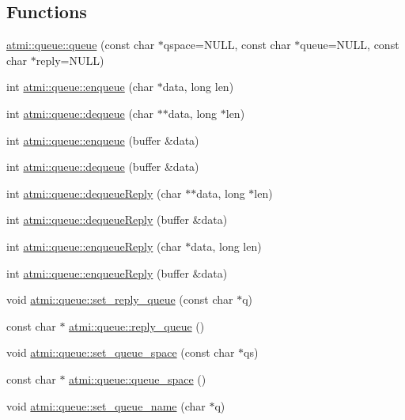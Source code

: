 \subsection*{Functions}
\begin{DoxyCompactItemize}
\item 
\hyperlink{group__atmi_gaf8c86b01e410fe6499a7f53cdf70eb35}{atmi\+::queue\+::queue} (const char $\ast$qspace=N\+U\+L\+L, const char $\ast$queue=N\+U\+L\+L, const char $\ast$reply=N\+U\+L\+L)
\item 
int \hyperlink{group__atmi_ga6b27337fd68ca97236e4905d09b7eb15}{atmi\+::queue\+::enqueue} (char $\ast$data, long len)
\item 
int \hyperlink{group__atmi_ga140e0faa2ab1265d3258ebc5f2049c41}{atmi\+::queue\+::dequeue} (char $\ast$$\ast$data, long $\ast$len)
\item 
int \hyperlink{group__atmi_ga76cf5d92f7d727b0af48698cca6225c5}{atmi\+::queue\+::enqueue} (buffer \&data)
\item 
int \hyperlink{group__atmi_ga656e7c4acd4bfefdbecf098907020fad}{atmi\+::queue\+::dequeue} (buffer \&data)
\item 
int \hyperlink{group__atmi_gaa8a60e7609a1c28ec346a898a80f8ea6}{atmi\+::queue\+::dequeue\+Reply} (char $\ast$$\ast$data, long $\ast$len)
\item 
int \hyperlink{group__atmi_ga1d0741ce63070da00a80cfc69db50797}{atmi\+::queue\+::dequeue\+Reply} (buffer \&data)
\item 
int \hyperlink{group__atmi_ga2ea608bb1f59fdccb2b7592381bcf267}{atmi\+::queue\+::enqueue\+Reply} (char $\ast$data, long len)
\item 
int \hyperlink{group__atmi_ga2e04e4731abc851e48f6caf77ba61ef2}{atmi\+::queue\+::enqueue\+Reply} (buffer \&data)
\item 
void \hyperlink{group__atmi_ga216acfef7e80352c8ce8476825f1146e}{atmi\+::queue\+::set\+\_\+reply\+\_\+queue} (const char $\ast$q)
\item 
const char $\ast$ \hyperlink{group__atmi_gac851146259feb3bf93aed287d6d42cb2}{atmi\+::queue\+::reply\+\_\+queue} ()
\item 
void \hyperlink{group__atmi_ga9b8f29fbb2012dda53d6f799ad2110b4}{atmi\+::queue\+::set\+\_\+queue\+\_\+space} (const char $\ast$qs)
\item 
const char $\ast$ \hyperlink{group__atmi_gaaf7d8d18008f9ee987b7e7aa2195d1db}{atmi\+::queue\+::queue\+\_\+space} ()
\item 
void \hyperlink{group__atmi_ga5d70bbf99076bd41269e2a558bf52475}{atmi\+::queue\+::set\+\_\+queue\+\_\+name} (char $\ast$q)

\end{DoxyCompactItemize}
